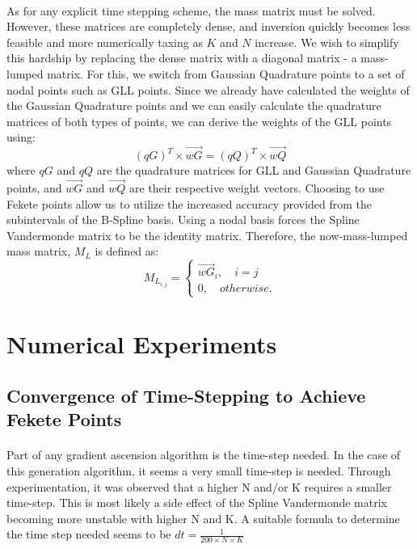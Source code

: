 \documentclass{article}
\begin{document}
\paragraph{}
As for any explicit time stepping scheme, the mass matrix must be solved. However, these matrices are completely dense, and inversion quickly becomes less feasible and more numerically taxing as $K$ and $N$ increase. We wish to simplify this hardship by replacing the dense matrix with a diagonal matrix - a mass-lumped matrix. For this, we switch from Gaussian Quadrature points to a set of nodal points such as GLL points. Since we already have calculated the weights of the Gaussian Quadrature points and we can easily calculate the quadrature matrices of both types of points, we can derive the weights of the GLL points using: 
\begin{equation*}
(qG)^T\times \vec{wG}=(qQ)^T\times \vec{wQ}
\end{equation*}
where $qG$ and $qQ$ are the quadrature matrices for GLL and Gaussian Quadrature points, and $\vec{wG}$ and $\vec{wQ}$ are their respective weight vectors. Choosing to use Fekete points allow us to utilize the increased accuracy provided from the subintervals of the B-Spline basis. Using a nodal basis forces the Spline Vandermonde matrix to be the identity matrix. Therefore, the now-mass-lumped mass matrix, $M_L$ is defined as:
\begin{equation*}
M_{L_{i,j}}=\begin{cases}
\vec{wG}_i,\quad i=j\\ 0,\quad otherwise.
\end{cases}
\end{equation*}

\section*{Numerical Experiments}
\subsection*{Convergence of Time-Stepping to Achieve Fekete Points}
\paragraph{}
Part of any gradient ascension algorithm is the time-step needed. In the case of this generation algorithm, it seems a very small time-step is needed. Through experimentation, it was observed that a higher N and/or K requires a smaller time-step. This is most likely a side effect of the Spline Vandermonde matrix becoming more unstable with higher N and K. A suitable formula to determine the time step needed seems to be $dt = \frac{1}{200\times N\times K}$
\end{document}

